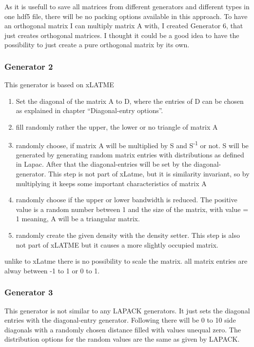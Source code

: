 \documentclass[a4paper]{article}
\begin{document}
As it is usefull to save all matrices from different generators and different types in one hdf5 file, there will be no packing options available in this approach.
To have an orthogonal matrix I can multiply matrix A with, I created Generator 6, that just creates orthogonal matrices. I thought it could be a good idea to have the possibility to just create a pure orthogonal matrix by its own.


\subsubsection{Generator 2}
This generator is based on xLATME
\begin{enumerate}
	\item Set the diagonal of the matrix A to D, where the entries of D can be chosen as explained in chapter “Diagonal-entry options”.
	\item fill randomly rather the upper, the lower or no triangle of matrix A
	\item randomly choose, if matrix A will be multiplied by S and S\textsuperscript{-1} or not. S will be generated by generating random matrix entries with distributions as defined in Lapac. After that the diagonal-entries will be set by the diagonal-generator.
	This step is not part of xLatme, but it is similarity invariant, so by multiplying it keeps some important characteristics of matrix A
	\item randomly choose if the upper or lower bandwidth is reduced. The positive value is a random number between 1 and the size of the matrix, with value = 1 meaning, A will be a triangular matrix.
	\item randomly create the given density with the density setter. This step is also not part of xLATME but it causes a more slightly occupied matrix.
\end{enumerate}
unlike to xLatme there is no possibility to scale the matrix. all matrix entries are alway between -1 to 1 or 0 to 1.

\subsubsection{Generator 3}
This generator is not similar to any LAPACK generators. It just sets the diagonal entries with the diagonal-entry generator. Following there will be 0 to 10 side diagonals with a randomly chosen distance filled with values unequal zero.
The distribution options for the random values are the same as given by LAPACK.
\end{document}
